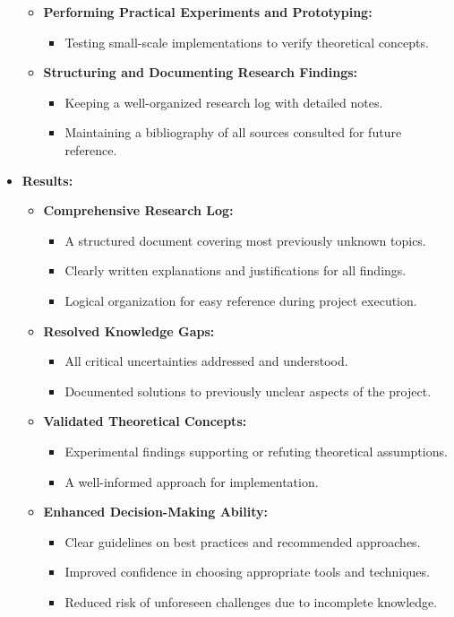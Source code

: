 \documentclass{article}
\begin{document}
\begin{itemize}[leftmargin=*, label={}]
\begin{itemize}
        \item \textbf{Performing Practical Experiments and Prototyping:}
        \begin{itemize}
            \item Testing small-scale implementations to verify theoretical concepts.
        \end{itemize}
        \item \textbf{Structuring and Documenting Research Findings:}
        \begin{itemize}
            \item Keeping a well-organized research log with detailed notes.
            \item Maintaining a bibliography of all sources consulted for future reference.
        \end{itemize}
    \end{itemize}

    \item \textbf{Results:}
    \begin{itemize}
        \item \textbf{Comprehensive Research Log:}
        \begin{itemize}
            \item A structured document covering most previously unknown topics.
            \item Clearly written explanations and justifications for all findings.
            \item Logical organization for easy reference during project execution.
        \end{itemize}
        \item \textbf{Resolved Knowledge Gaps:}
        \begin{itemize}
            \item All critical uncertainties addressed and understood.
            \item Documented solutions to previously unclear aspects of the project.
        \end{itemize}
        \item \textbf{Validated Theoretical Concepts:}
        \begin{itemize}
            \item Experimental findings supporting or refuting theoretical assumptions.
            \item A well-informed approach for implementation.
        \end{itemize}
        \item \textbf{Enhanced Decision-Making Ability:}
        \begin{itemize}
            \item Clear guidelines on best practices and recommended approaches.
            \item Improved confidence in choosing appropriate tools and techniques.
            \item Reduced risk of unforeseen challenges due to incomplete knowledge.
        \end{itemize}
    \end{itemize}
\end{itemize}
\end{document}

